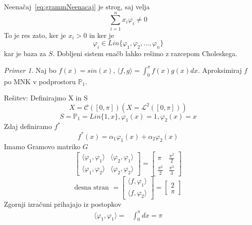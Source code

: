 \documentclass[a4paper,12pt]{article}
\newcommand{\innerproduct}[2]{\langle #1, #2 \rangle}
\theoremstyle{definition}
\theoremstyle{remark}
\newtheorem*{ex}{Primer}
\newcommand{\Pp}{\mathbb{P}}
\begin{document}
Neenačaj~\ref{eq:grammNeenacaj} je strog, saj velja
\begin{equation*}
    \sum_{i = 1}^{n} x_i \varphi_i \neq 0
\end{equation*}
To je res zato, ker je $x_i > 0$ in ker je
\begin{equation*}
    \varphi_i \in Lin\{\varphi_1, \varphi_2, \dots, \varphi_n\}
\end{equation*}
kar je baza za $S$. Dobljeni sistem enačb lahko rešimo z razcepom Choleskega.

\begin{ex}
    Naj bo $f(x) = sin (x)$, $\innerproduct{f}{g} = \int_{0}^{\pi} f(x) g(x) dx$. Aproksimiraj $f$ po MNK v podprostoru $\Pp_1$.

    Rešitev:
    Definirajmo X in S
    \[X = \mathscr{C} ([0, \pi]) (X = \mathscr{L}^2 ([0, \pi]))\]
    \[S = \Pp_1 = Lin\{1, x\}, \varphi_1(x) = 1, \varphi_2 (x) = x\]
    Zdaj definiramo $f^*$
    \[f^*(x) = \alpha_1 \varphi_1(x) + \alpha_2 \varphi_2(x)\]
    Imamo Gramovo matriko $G$
    \begin{equation*}
        \begin{bmatrix}
            \innerproduct{\varphi_1}{\varphi_1} & \innerproduct{\varphi_2}{\varphi_1}\\
            \innerproduct{\varphi_1}{\varphi_2} & \innerproduct{\varphi_2}{\varphi_2}
        \end{bmatrix}
        =
        \begin{bmatrix}
            \pi & \frac{\pi^2}{2} \\
            \frac{\pi^2}{2} & \frac{\pi^3}{3}
        \end{bmatrix}
    \end{equation*}
    \begin{equation*}
        \text{desna stran } =
        \begin{bmatrix}
            \innerproduct{f}{\varphi_1} \\
            \innerproduct{f}{\varphi_2}
        \end{bmatrix}
        =
        \begin{bmatrix}
            2 \\
            \pi
        \end{bmatrix}
    \end{equation*}
    Zgornji izračuni prihajajo iz postopkov
    \begin{align*}
        \innerproduct{\varphi_1}{\varphi_1} =& \int_{0}^{\pi} dx = \pi \\

\end{align*}
\end{ex}
\end{document}
